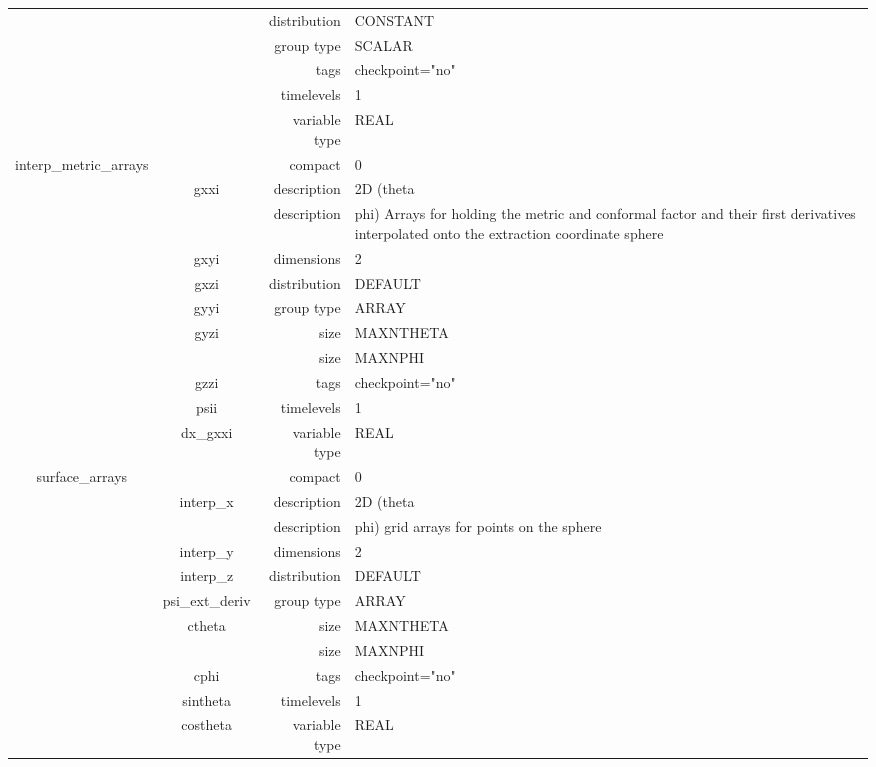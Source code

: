 \documentclass{article}
\begin{document}
\begin{tabular*}{150mm}{|c|c@{\extracolsep{\fill}}|rl|}
 &  & distribution & CONSTANT \\ 
 &  & group type & SCALAR \\ 
 &  & tags & checkpoint="no" \\ 
 &  & timelevels & 1 \\ 
 &  & variable type & REAL \\ 
\hline 
interp\_metric\_arrays &  & compact & 0 \\ 
 & gxxi & description & 2D (theta \\ 
& ~ & description & phi) Arrays for holding the metric and conformal factor and their first derivatives interpolated onto the extraction coordinate sphere \\ 
 & gxyi & dimensions & 2 \\ 
 & gxzi & distribution & DEFAULT \\ 
 & gyyi & group type & ARRAY \\ 
 & gyzi & size & MAXNTHETA \\ 
& ~ & size & MAXNPHI \\ 
 & gzzi & tags & checkpoint="no" \\ 
 & psii & timelevels & 1 \\ 
 & dx\_gxxi & variable type & REAL \\ 
\hline 
surface\_arrays &  & compact & 0 \\ 
 & interp\_x & description & 2D (theta \\ 
& ~ & description & phi) grid arrays for points on the sphere \\ 
 & interp\_y & dimensions & 2 \\ 
 & interp\_z & distribution & DEFAULT \\ 
 & psi\_ext\_deriv & group type & ARRAY \\ 
 & ctheta & size & MAXNTHETA \\ 
& ~ & size & MAXNPHI \\ 
 & cphi & tags & checkpoint="no" \\ 
 & sintheta & timelevels & 1 \\ 
 & costheta & variable type & REAL \\ 
\hline 
\end{tabular*} 



\vspace{5mm}
\vspace{5mm}
\end{document}

